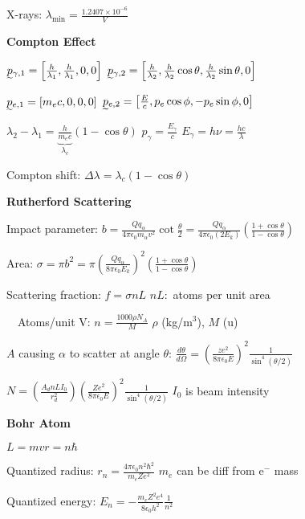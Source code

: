 \documentclass[twocolumn]{article}
\begin{document}
X-rays: $\lambda_{\text{min}} = \frac{1.2407 \times 10^{-6}}{V}$

\dotfill

\textbf{Compton Effect}

$\undertilde{p}_{\gamma, 1} = \left[ \frac{h}{\lambda_1}, \frac{h}{\lambda_1}, 0, 0 \right]$ \hfill $\undertilde{p}_{\gamma, 2} = \left[ \frac{h}{\lambda_2}, \frac{h}{\lambda_2} \cos \theta, \frac{h}{\lambda_2} \sin \theta, 0 \right]$

$\undertilde{p}_{e, 1} = \left[ m_e c, 0, 0, 0 \right]$ \hfill $\undertilde{p}_{e, 2} = \left[ \frac{E}{c}, p_e \cos \phi, -p_e \sin \phi, 0 \right]$

$\lambda_2 - \lambda_1 = \underbrace{\frac{h}{m_e c}}_{\lambda_c} (1 - \cos \theta)$ \hfill $p_\gamma = \frac{E_\gamma}{c}$ \hfill $E_\gamma = h\nu = \frac{hc}{\lambda}$

Compton shift: $\Delta \lambda = \lambda_c(1-\cos \theta)$

\vspace{-.5em}
\dotfill

\textbf{Rutherford Scattering}

Impact parameter: $b = \frac{Q q_\alpha}{4 \pi \epsilon_0 m_\alpha v^2} \cot \frac{\theta}{2} = \frac{Qq_\alpha}{4\pi\epsilon_0 (2E_k)} \left( \frac{1+\cos\theta}{1-\cos\theta} \right)$

Area: $\sigma = \pi b^2 = \pi \left( \frac{Q q_\alpha}{8 \pi \epsilon_0 E_k} \right)^2 \left( \frac{1+\cos\theta}{1-\cos\theta} \right)$

Scattering fraction: $f = \sigma n L$ \hfill $nL:$ atoms per unit area

$\quad$Atoms/unit V: $n = \frac{1000 \rho N_A}{M}$ \hfill $\rho$ (kg/m$^3$), $M$ (u)

$A$ causing $\alpha$ to scatter at angle $\theta$: $\frac{d\theta}{d \Omega} = \left( \frac{ze^2}{8 \pi \epsilon_0 E} \right)^2 \frac{1}{\sin^4(\theta/2)}$

$N = \left( \frac{A_d nL I_0}{r_d^2} \right) \left( \frac{Ze^2}{8 \pi \epsilon_0 E} \right)^2 \frac{1}{\sin^4(\theta/2)}$ \hfill $I_0$ is beam intensity

\dotfill

\textbf{Bohr Atom}

$L = mvr = n\hbar$

Quantized radius: $r_n = \frac{4 \pi \epsilon_0 n^2 \hbar^2}{m_e Z e^2}$  \hfill $m_e$ can be diff from e$^-$ mass

Quantized energy: $E_n = -\frac{m_e Z^2e^4}{8\epsilon_0 h^2} \frac{1}{n^2}$
\end{document}
